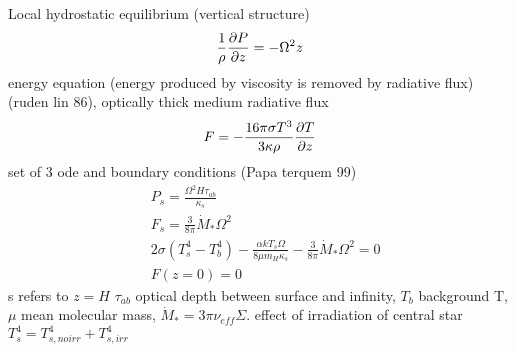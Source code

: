 \begin{workout}
Local hydrostatic equilibrium (vertical structure)
\begin{equation}
\frac{1}{\rho}\PDy{z}{P}=-\Omega^2z
\end{equation}
energy equation (energy produced by viscosity is removed by radiative flux)(ruden lin 86), optically thick medium radiative flux
\begin{equation}
F=-\frac{16\pi\sigma T^3}{3\kappa\rho}\PDy{z}{T}
\end{equation}
set of 3 ode and boundary conditions (Papa terquem 99)
\begin{align}
&P_s=\frac{\Omega^2H\tau_{ab}}{\kappa_s}\\
&F_s=\frac{3}{8\pi}\dot{M}_*\Omega^2\\
&2\sigma(T_s^4-T_b^4)-\frac{\alpha kT_s\Omega}{8\mu m_H\kappa_s}-\frac{3}{8\pi}\dot{M}_*\Omega^2=0\\
&F(z=0)=0
\end{align}
s refers to $z=H$ $\tau_{ab}$ optical depth between surface and infinity, $T_b$ background T, $\mu$ mean molecular mass, $\dot{M}_*=3\pi\nu_{eff}\Sigma$.
effect of irradiation of central star $T_s^4=T_{s,noirr}^4+T_{s,irr}^4$
\end{workout}


